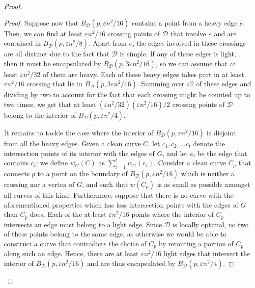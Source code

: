 \documentclass{article}
\begin{document}
\begin{proof}
\begin{proof}
    Suppose now that $B_{\mathcal{D}}(p,\varepsilon n^2/16)$ contains a point from a heavy edge $e$. Then, we can find at least $\varepsilon n^2/16$ crossing points of $\mathcal{D}$ that involve $e$ and are contained in $B_{\mathcal{D}}(p,\varepsilon n^2/8)$. Apart from $e$, the edges involved in these crossings are all distinct due to the fact that $\mathcal{D}$ is simple. If any of these edges is light, then it must be encapsulated by $B_{\mathcal{D}}(p,3\varepsilon n^2/16)$, so we can assume that at least $\varepsilon n^2/32$ of them are heavy. Each of these heavy edges takes part in at least $\varepsilon n^2/16$ crossing that lie in $B_{\mathcal{D}}(p,3\varepsilon n^2/16)$. Summing over all of these edges and dividing by two to account for the fact that each crossing might be counted up to two times, we get that at least $(\varepsilon n^2/32)(\varepsilon n^2/16)/2$ crossing points of $\mathcal{D}$ belong to the interior of $B_{\mathcal{D}}(p,\varepsilon n^2/4)$.
    
    It remains to tackle the case where the interior of $B_{\mathcal{D}}(p,\varepsilon n^2/16)$ is disjoint from all the heavy edges. Given a clean curve $C$, let $c_1,c_2,\dots c_t$ denote the intersection points of its interior with the edges of $G$, and let $e_i$ be the edge that contains $c_i$; we define $w_G(C)$ as $\sum_{i=1}^t w_G(e_i)$. Consider a clean curve $C_p$ that connects $p$ to a point on the boundary of $B_{\mathcal{D}}(p,\varepsilon n^2/16)$ which is neither a crossing nor a vertex of $G$, and such that $w(C_p)$ is as small as possible amongst all curves of this kind. Furthermore, suppose that there is no curve with the aforementioned properties which has less intersection points with the edges of $G$ than $C_p$ does. Each of the at least $\varepsilon n^2/16$ points where the interior of $C_p$ intersects an edge must belong to a light edge. Since $\mathcal{D}$ is locally optimal, no two of these points belong to the same edge, as otherwise we would be able to construct a curve that contradicts the choice of $C_p$ by rerouting a portion of $C_p$ along such an edge. Hence, there are at least $\varepsilon n^2/16$ light edges that intersect the interior of $B_{\mathcal{D}}(p,\varepsilon n^2/16)$ and are thus encapsulated by $B_{\mathcal{D}}(p,\varepsilon n^2/4)$.
    \end{proof}


\end{proof}
\end{document}
